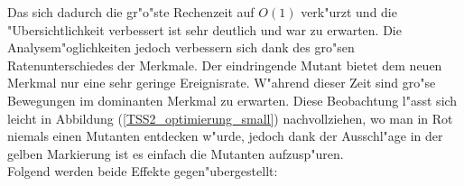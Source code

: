 \documentclass[11pt, a4paper, german]{article}
\theoremstyle{plain}
\begin{document}
	Das sich dadurch die gr"o"ste Rechenzeit auf $ O(1) $ verk"urzt und die "Ubersichtlichkeit verbessert ist sehr deutlich und war zu erwarten. Die Analysem"oglichkeiten jedoch verbessern sich dank des gro"sen Ratenunterschiedes der Merkmale. Der eindringende Mutant bietet dem neuen Merkmal nur eine sehr geringe Ereignisrate. W"ahrend dieser Zeit sind gro"se Bewegungen im dominanten Merkmal zu erwarten. Diese Beobachtung l"asst sich leicht in Abbildung (\ref{TSS2_optimierung_small}) nachvollziehen, wo man in Rot niemals einen Mutanten entdecken w"urde, jedoch dank der Ausschl"age in der gelben Markierung ist es einfach die Mutanten aufzusp"uren.\\
	Folgend werden beide Effekte gegen"ubergestellt:\\
	\begin{center}
	\begin{minipage}{0.6\textwidth}
	\begin{minipage}{0.45\textwidth}
		\centering

\end{minipage}
\end{minipage}
\end{center}
\end{document}
